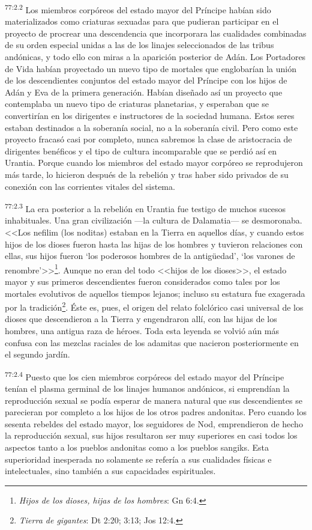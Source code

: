 \par
\textsuperscript{77:2.2} Los miembros corpóreos del estado mayor del Príncipe habían sido materializados como criaturas sexuadas para que pudieran participar en el proyecto de procrear una descendencia que incorporara las cualidades combinadas de su orden especial unidas a las de los linajes seleccionados de las tribus andónicas, y todo ello con miras a la aparición posterior de Adán. Los Portadores de Vida habían proyectado un nuevo tipo de mortales que englobarían la unión de los descendientes conjuntos del estado mayor del Príncipe con los hijos de Adán y Eva de la primera generación. Habían diseñado así un proyecto que contemplaba un nuevo tipo de criaturas planetarias, y esperaban que se convertirían en los dirigentes e instructores de la sociedad humana. Estos seres estaban destinados a la soberanía social, no a la soberanía civil. Pero como este proyecto fracasó casi por completo, nunca sabremos la clase de aristocracia de dirigentes benéficos y el tipo de cultura incomparable que se perdió así en Urantia. Porque cuando los miembros del estado mayor corpóreo se reprodujeron más tarde, lo hicieron después de la rebelión y tras haber sido privados de su conexión con las corrientes vitales del sistema.

\par
\textsuperscript{77:2.3} La era posterior a la rebelión en Urantia fue testigo de muchos sucesos inhabituales. Una gran civilización ---la cultura de Dalamatia--- se desmoronaba. <<Los nefilim (los noditas) estaban en la Tierra en aquellos días, y cuando estos hijos de los dioses fueron hasta las hijas de los hombres y tuvieron relaciones con ellas, sus hijos fueron `los poderosos hombres de la antig\"uedad', `los varones de renombre'>>\footnote{\textit{Hijos de los dioses, hijas de los hombres}: Gn 6:4.}. Aunque no eran del todo <<hijos de los dioses>>, el estado mayor y sus primeros descendientes fueron considerados como tales por los mortales evolutivos de aquellos tiempos lejanos; incluso su estatura fue exagerada por la tradición\footnote{\textit{Tierra de gigantes}: Dt 2:20; 3:13; Jos 12:4.}. Éste es, pues, el origen del relato folclórico casi universal de los dioses que descendieron a la Tierra y engendraron allí, con las hijas de los hombres, una antigua raza de héroes. Toda esta leyenda se volvió aún más confusa con las mezclas raciales de los adamitas que nacieron posteriormente en el segundo jardín.

\par
\textsuperscript{77:2.4} Puesto que los cien miembros corpóreos del estado mayor del Príncipe tenían el plasma germinal de los linajes humanos andónicos, si emprendían la reproducción sexual se podía esperar de manera natural que sus descendientes se parecieran por completo a los hijos de los otros padres andonitas. Pero cuando los sesenta rebeldes del estado mayor, los seguidores de Nod, emprendieron de hecho la reproducción sexual, sus hijos resultaron ser muy superiores en casi todos los aspectos tanto a los pueblos andonitas como a los pueblos sangiks. Esta superioridad inesperada no solamente se refería a sus cualidades físicas e intelectuales, sino también a sus capacidades espirituales.

